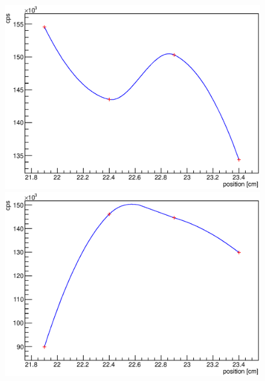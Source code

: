 \begin{figure}
	\begin{minipage}[d]{0.24 \textwidth}
		  \includegraphics[width=\textwidth]{graphics/cobalt/modules/5A.eps}
	\end{minipage}
	\begin{minipage}[d]{0.24 \textwidth}
		  \includegraphics[width=\textwidth]{graphics/cobalt/modules/5B.eps}
	\end{minipage}
	\begin{minipage}[d]{0.24 \textwidth}

\end{minipage}
\end{figure}
